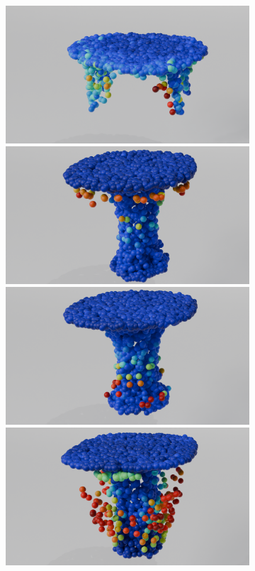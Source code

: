 \begin{figure}[htb]
\begin{subfigure}[t]{0.315\textwidth}
        \includegraphics[width=\textwidth]{figures/dc_lin_t3.png}
        \includegraphics[width=\textwidth]{figures/do_lin_t3.png}
        \includegraphics[width=\textwidth]{figures/ens_lin_t3.png}
        \includegraphics[width=\textwidth]{figures/iml_lin_t3.png}

\end{subfigure}
\end{figure}
